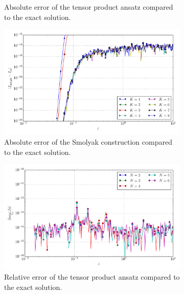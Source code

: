 \documentclass[a4paper,10pt]{article}
\begin{document}
\begin{figure}[ht!]
\begin{subfigure}[t]{0.5\linewidth}
    \caption{Absolute error of the tensor product ansatz compared to the exact solution.}
    \label{fig:tp_sg_4d_conv_p_3000_3000_err_nsd_tp}
  \end{subfigure}
  \begin{subfigure}[t]{0.5\linewidth}
    \includegraphics[width=\linewidth]{./plots/tp_sg_4d_conv_eps_(3,0,0,0)_(3,0,0,0)_err_nsd_gk.pdf}
    \caption{Absolute error of the Smolyak construction compared to the exact solution.}
    \label{fig:tp_sg_4d_conv_p_3000_3000_err_nsd_gk}
  \end{subfigure}
  \begin{subfigure}[t]{0.5\linewidth}
    \includegraphics[width=\linewidth]{./plots/tp_sg_4d_conv_eps_(3,0,0,0)_(3,0,0,0)_err_rel_nsd_tp.pdf}
    \caption{Relative error of the tensor product ansatz compared to the exact solution.}
    \label{fig:tp_sg_4d_conv_p_3000_3000_err_rel_nsd_tp}
  \end{subfigure}
  \begin{subfigure}[t]{0.5\linewidth}

\end{subfigure}
\end{figure}
\end{document}

